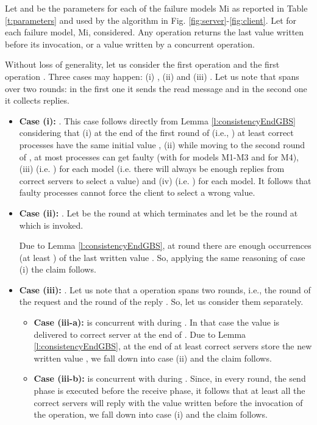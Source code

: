 \begin{theorem}[Validity]\label{t:validity}
Let  and  be the parameters for each of the  failure models Mi as reported in Table \ref{t:parameters} and used by the algorithm in Fig. \ref{fig:server}-\ref{fig:client}.
Let  for each failure model, Mi, considered. 
Any  operation returns the last value written before its invocation, or a value written by a concurrent  operation. 
\end{theorem}

\begin{proofT}
Without loss of generality, let us consider the first  operation  and the first  operation . 
Three cases may happen: (i) , (ii)  and (iii) .
Let us note that  spans over two rounds: in the first one it sends the {\sc read} message and in the second one it collects replies.

	\begin{itemize}
		\item {\bf Case (i):} . This case follows directly from Lemma \ref{l:consistencyEndGBS} considering that (i) at the end of the first round of  (i.e., ) at least  correct processes have the same initial value , (ii) while moving to the second round of , at most  processes can get faulty (with  for models M1-M3 and  for M4), (iii)  (i.e. ) for each model (i.e. there will always be enough replies from correct servers to select a value) and (iv)  (i.e. ) for each model.
It follows that faulty processes cannot force the client to select a wrong value.\\
		
		\item  {\bf Case (ii):} . Let  be the round at which  terminates and let  be the round at which  is invoked.
		
Due to Lemma \ref{l:consistencyEndGBS}, at round  there are enough occurrences (at least ) of the last written value . So, applying the same reasoning of case (i) the claim follows.\\	
		
		\item {\bf Case (iii):} . Let us note that a  operation spans two rounds, i.e., the round of the request  and the round of the reply . So, let us consider them separately.
		
		\begin{itemize}
			\item {\bf Case (iii-a):}  is concurrent with  during . In that case the value  is delivered to correct server at the end of . Due to Lemma \ref{l:consistencyEndGBS}, at the end of  at least  correct servers store the new written value , we fall down into case (ii) and the claim follows.\\
\item {\bf Case (iii-b):}  is concurrent with  during . Since, in every round, the send phase is executed before the receive phase, it follows that at least all the correct servers will reply with the value written before the invocation of the  operation, we fall down into case (i) and the claim follows.
\end{itemize}	
	\end{itemize}
	
\renewcommand{\toto}{t:validity}
\end{proofT}

